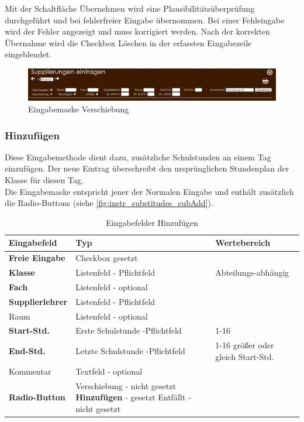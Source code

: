 Mit der Schaltfläche Übernehmen wird eine Plausibilitätsüberprüfung durchgeführt und bei fehlerfreier Eingabe übernommen. Bei einer Fehleingabe wird der Fehler angezeigt und muss korrigiert werden. Nach der korrekten Übernahme wird die Checkbox Löschen in der erfassten Eingabezeile eingeblendet.
\begin{figure}[H]
\centering
\includegraphics[keepaspectratio=true, width=14cm]{images/screenshots/substitudes_move.png}
\caption{Eingabemaske Verschiebung}
\label{fig:instr_substitudes_subMove}
\end{figure}
\subsubsection{Hinzufügen}\label{sec:instr_admin_sub_add}
Diese Eingabemethode dient dazu, zusätzliche Schulstunden an einem Tag einzufügen. Der neue Eintrag überschreibt den ursprünglichen Stundenplan der Klasse für diesen Tag.\\
Die Eingabemaske entspricht jener der Normalen Eingabe und enthält zusätzlich die Radio-Buttons (siehe \autoref{fig:instr_substitudes_subAdd}).
\begin{table}[H]
\centering
\begin{tabular}{p{3 cm}p{6 cm}p{5 cm}}
   \toprule
   \textbf{Eingabefeld} & \textbf{Typ} & \textbf{Wertebereich} \\
   \midrule
          \textbf{Freie Eingabe} & Checkbox \newline gesetzt & \\
          \hline
          \textbf{Klasse} & Listenfeld - Pflichtfeld & Abteilungs-abhängig \\
          \hline
          \textbf{Fach} & Listenfeld - optional & \\
          \hline
          \textbf{Supplierlehrer} & Listenfeld - Pflichtfeld & \\
          \hline
          Raum & Listenfeld - optional & \\
          \hline
          \textbf{Start-Std.} & Erste Schulstunde  -Pflichtfeld & 1-16 \\
		  \hline
          \textbf{End-Std.} & Letzte Schulstunde -Pflichtfeld & 1-16 \newline größer oder gleich Start-Std.\\
          \hline
          Kommentar & Textfeld - optional & \\
          \hline
          \textbf{Radio-Button} & Verschiebung - nicht gesetzt\newline 
          \textbf{Hinzufügen} - gesetzt \newline Entfällt - nicht gesetzt & \\
   \bottomrule
\end{tabular}
\caption{Eingabefelder Hinzufügen}
\end{table}
